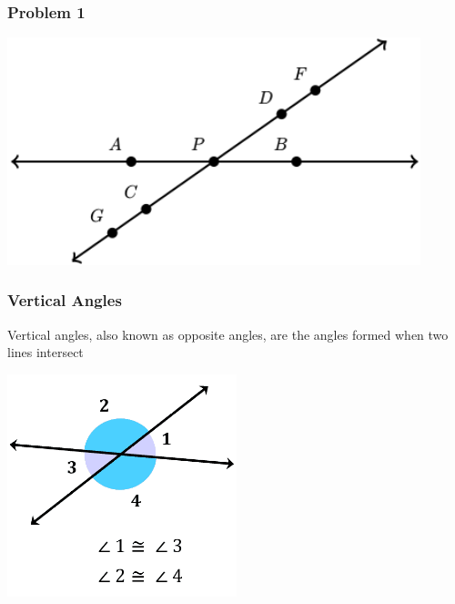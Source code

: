 \documentclass{beamer}
\begin{document}
\begin{frame}
    \frametitle{Problem 1}
    
    \begin{center}
        \includegraphics[width=0.9\textwidth]{supplementary_angles.png} %
    \end{center}

\end{frame} 

\begin{frame}
    \frametitle{Vertical Angles}
    \begin{block}{}
        Vertical angles, also known as opposite angles, are the angles formed when two lines intersect
    \end{block}
    \begin{center}
        \includegraphics[width=0.5\textwidth]{vertical_angles_1.png} %
    \end{center}

\end{frame}
\end{document}

